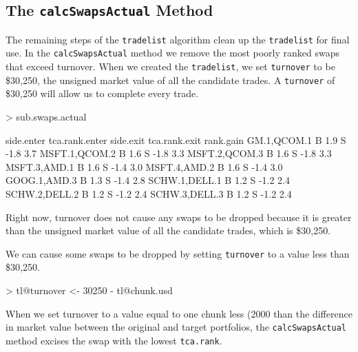 \documentclass{article}
\begin{document}
\subsection{The \texttt{calcSwapsActual} Method}
\label{calcSwapsActual}

The remaining steps of the \texttt{tradelist} algorithm clean up the
\texttt{tradelist} for final use.  In the \texttt{calcSwapsActual}
method we remove the most poorly ranked swaps that exceed turnover.
When we created the \texttt{tradelist}, we set \texttt{turnover} to be
\$30,250, the unsigned market
value of all the candidate trades.  A \texttt{turnover} of
\$30,250 will allow us to
complete every trade.


\begin{Schunk}
\begin{Sinput}
> sub.swaps.actual
\end{Sinput}
\begin{Soutput}
              side.enter tca.rank.enter side.exit tca.rank.exit rank.gain
GM.1,QCOM.1            B            1.9         S          -1.8       3.7
MSFT.1,QCOM.2          B            1.6         S          -1.8       3.3
MSFT.2,QCOM.3          B            1.6         S          -1.8       3.3
MSFT.3,AMD.1           B            1.6         S          -1.4       3.0
MSFT.4,AMD.2           B            1.6         S          -1.4       3.0
GOOG.1,AMD.3           B            1.3         S          -1.4       2.8
SCHW.1,DELL.1          B            1.2         S          -1.2       2.4
SCHW.2,DELL.2          B            1.2         S          -1.2       2.4
SCHW.3,DELL.3          B            1.2         S          -1.2       2.4
\end{Soutput}
\end{Schunk}

Right now, turnover does not cause any swaps to be dropped because it
is greater than the unsigned market value of all the candidate trades,
which is \$30,250.
  
We can cause some swaps to be dropped by setting \texttt{turnover} to
a value less than \$30,250.


\begin{Schunk}
\begin{Sinput}
> tl@turnover <- 30250 - tl@chunk.usd
\end{Sinput}
\end{Schunk}


When we set turnover to a value equal to one chunk less
(2000 than the difference in market value between the
original and target portfolios, the \texttt{calcSwapsActual} method
excises the swap with the lowest \texttt{tca.rank}.
\end{document}
